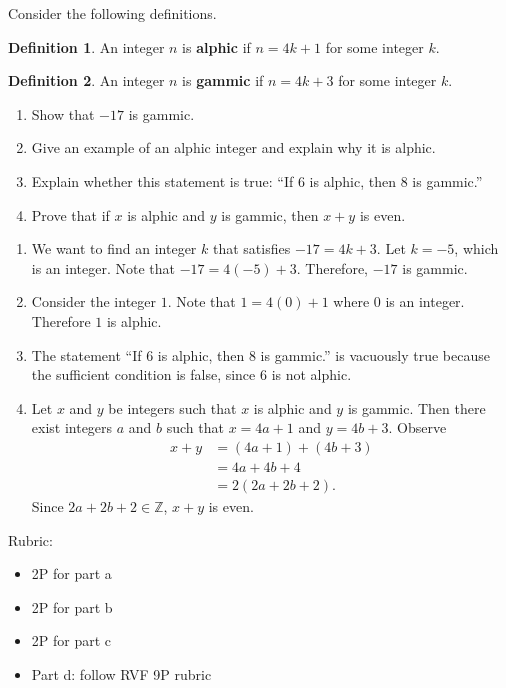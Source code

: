 \documentclass{article}
\theoremstyle{definition}
\newtheorem*{definition}{Definition}
\begin{document}
\begin{question}{15}
    Consider the following definitions.
	\begin{definition}
	 An integer $n$ is \textbf{alphic} if $n=4k+1$ for some integer $k$.
	\end{definition}
	\begin{definition}
	 An integer $n$ is \textbf{gammic} if $n=4k+3$ for some integer $k$.
	\end{definition}
        \begin{enumerate}
           \item Show that $-17$ is gammic.
           \item Give an example of an alphic integer and explain why it is alphic.
           \item Explain whether this statement is true: ``If $6$ is alphic, then $8$ is gammic.''
           \item Prove that if $x$ is alphic and $y$ is gammic, then $x+y$ is even.
        \end{enumerate}
\end{question}
\begin{solution}
    \begin{enumerate}
      \item We want to find an integer $k$ that satisfies $-17=4k+3$. Let $k=-5$, which is an integer. Note that $-17 = 4(-5) + 3$. Therefore, $-17$ is gammic.
      \item Consider the integer $1$. Note that $1 = 4(0) +1$ where $0$ is an integer. Therefore $1$ is alphic.
      \item The statement ``If $6$ is alphic, then $8$ is gammic.'' is vacuously true because the sufficient condition is false, since $6$ is not alphic.
      \item Let $x$ and $y$ be integers such that $x$ is alphic and $y$ is gammic. Then there exist integers $a$ and $b$ such that $x=4a+1$ and $y=4b+3$. Observe
      \begin{align*}
      x + y & = (4a+1) + (4b+3)\\
      & = 4a + 4b + 4\\
      & = 2 ( 2a + 2b + 2).
      \end{align*}
      Since $2a + 2b + 2\in \mathbb{Z}$, $x + y$ is even.
    \end{enumerate}
    
{\color{red} Rubric:
\begin{itemize}
\item 2P for part a
\item 2P for part b
\item 2P for part c
\item Part d: follow RVF 9P rubric
\end{itemize}}
\end{solution}
\end{document}
